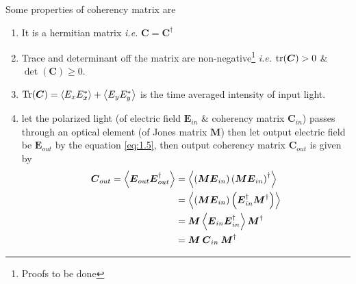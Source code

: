 \documentclass[11pt,a4paper]{article}
\numberwithin{equation}{section}
\begin{document}
Some properties of coherency matrix are
\begin{enumerate}
	\item It is a hermitian matrix \textit{i.e.} $\boldsymbol{C}=\boldsymbol{C}^\dagger$
	\item Trace and determinant off the matrix are non-negative\footnote{Proofs to be done} \textit{i.e.} $\tr(\boldsymbol{C})>0$ \& $\det(\boldsymbol{C})\ge0$.
	\item $\Tr(\boldsymbol{C}) = \expval{E_x E_x^\ast} +\expval{E_y E_y^\ast}$ is the time averaged intensity of input light.
	\item let the polarized light (of electric field $\boldsymbol{E}_{in}$ \& coherency matrix $\boldsymbol{C}_{in}$) passes through an optical element (of Jones matrix $\boldsymbol{M}$) then let output electric field be $\boldsymbol{E}_{out}$ by the equation \ref{eq:1.5}, then output coherency matrix $\boldsymbol{C}_{out}$ is given by 
	\begin{align}
		\boldsymbol{C}_{out} = \expval{\boldsymbol{E}_{out}\boldsymbol{E}_{out}^\dagger} &= \expval{\left(\boldsymbol{M}\boldsymbol{E}_{in} \right) \left(\boldsymbol{M}\boldsymbol{E}_{in}\right)^\dagger}\nonumber\\
		&= \expval{\left(\boldsymbol{M}\boldsymbol{E}_{in} \right) \left(\boldsymbol{E}_{in}^\dagger\boldsymbol{M}^\dagger\right)}\nonumber \\
		&= \boldsymbol{M}\expval{\boldsymbol{E}_{in} \boldsymbol{E}_{in}^\dagger}\boldsymbol{M}^\dagger \nonumber\\
		&= \boldsymbol{M}\:\boldsymbol{C}_{in}\:\boldsymbol{M}^\dagger \label{eq:1.10}
	\end{align}
\end{enumerate}
\end{document}
